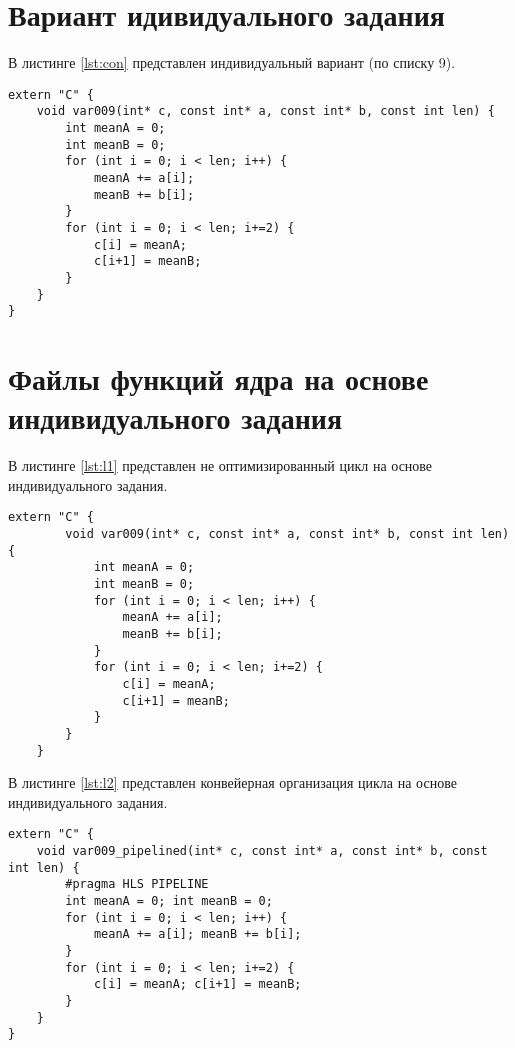 \chapter*{Вариант идивидуального задания}

В листинге \ref{lst:con} представлен индивидуальный вариант (по списку 9).

\captionsetup{singlelinecheck = false, justification=raggedright}
\begin{lstlisting}[label=lst:con,caption=Индивидуальный вариант 9]
extern "C" {
	void var009(int* c, const int* a, const int* b, const int len) {
		int meanA = 0;
		int meanB = 0;
		for (int i = 0; i < len; i++) {
			meanA += a[i];
			meanB += b[i];
		}
		for (int i = 0; i < len; i+=2) {
			c[i] = meanA;
			c[i+1] = meanB;
		}
	}
}
\end{lstlisting}


\chapter*{Файлы функций ядра на основе индивидуального задания}

В листинге \ref{lst:l1} представлен не оптимизированный цикл на основе индивидуального задания.
\captionsetup{singlelinecheck = false, justification=raggedright}
\begin{lstlisting}[label=lst:l1,caption=Индивидуальный вариант 9]
	extern "C" {
		void var009(int* c, const int* a, const int* b, const int len) {
			int meanA = 0;
			int meanB = 0;
			for (int i = 0; i < len; i++) {
				meanA += a[i];
				meanB += b[i];
			}
			for (int i = 0; i < len; i+=2) {
				c[i] = meanA;
				c[i+1] = meanB;
			}
		}
	}
\end{lstlisting}

В листинге \ref{lst:l2} представлен конвейерная организация цикла на основе индивидуального задания.
\captionsetup{singlelinecheck = false, justification=raggedright}
\begin{lstlisting}[label=lst:l2,caption=Индивидуальный вариант 9]
extern "C" {
	void var009_pipelined(int* c, const int* a, const int* b, const int len) {
		#pragma HLS PIPELINE
		int meanA = 0; int meanB = 0;
		for (int i = 0; i < len; i++) {
			meanA += a[i]; meanB += b[i];
		}
		for (int i = 0; i < len; i+=2) {
			c[i] = meanA; c[i+1] = meanB;
		}
	}
}

\end{lstlisting}


